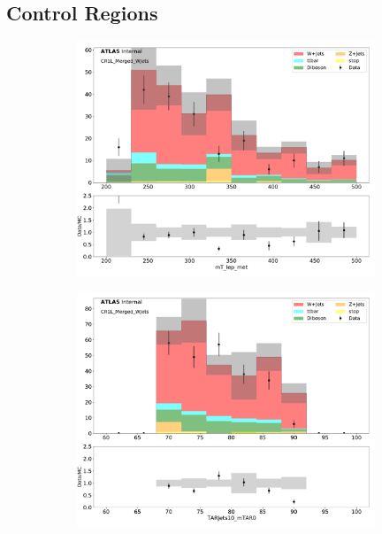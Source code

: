 \subsection{\wjets Control Regions}
\begin{figure}[htbp]
  \centering
     \begin{subfigure}{0.49\textwidth}
     \includegraphics[width = 0.98\textwidth]{Figures/4/datamc/CR1L_Merged_WJets/mT_lep_met.pdf}
    \caption{\mtlepmet}
     \end{subfigure}
    \begin{subfigure}{0.49\textwidth}
     \includegraphics[width = 0.98\textwidth]{Figures/4/datamc/CR1L_Merged_WJets/TARJets10_mTAR0.pdf}

\end{subfigure}
\end{figure}
